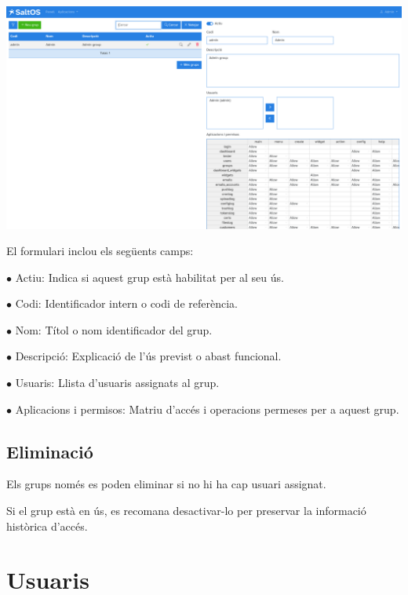 \documentclass[a4paper]{article}
\begin{document}
\begin{center}\includegraphics[width=1\textwidth]{../ujest/snaps/test-screenshots-js-screenshots-users-groups-edit-1-ca-es-1-snap.png}\end{center}

El formulari inclou els següents camps:

\begin{compactitem}
\item[\color{myblue}$\bullet$] Actiu: Indica si aquest grup està habilitat per al seu ús.
\item[\color{myblue}$\bullet$] Codi: Identificador intern o codi de referència.
\item[\color{myblue}$\bullet$] Nom: Títol o nom identificador del grup.
\item[\color{myblue}$\bullet$] Descripció: Explicació de l'ús previst o abast funcional.
\item[\color{myblue}$\bullet$] Usuaris: Llista d'usuaris assignats al grup.
\item[\color{myblue}$\bullet$] Aplicacions i permisos: Matriu d'accés i operacions permeses per a aquest grup.
\end{compactitem}

\hypertarget{toc180}{}
\subsection{Eliminació}

Els grups només es poden eliminar si no hi ha cap usuari assignat.

Si el grup està en ús, es recomana desactivar-lo per preservar la informació històrica d'accés.


\hypertarget{toc181}{}
\section{Usuaris}
\end{document}
